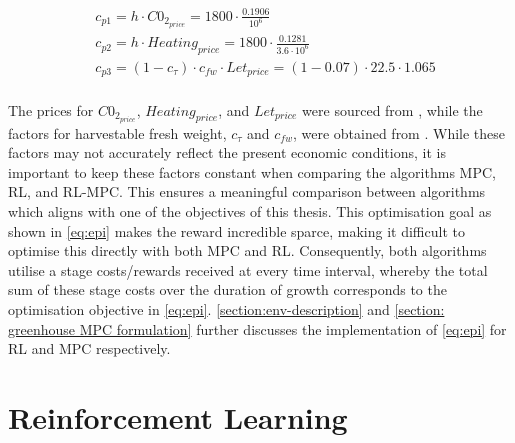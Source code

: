 \begin{equation}\label{eq:pricing factors}
	\begin{aligned}
		& c_{p1} = h \cdot C0_{2_{price}}  = 1800 \cdot \frac{0.1906}{10^{6}}\\
		& c_{p2} = h \cdot  Heating_{price} = 1800 \cdot \frac{0.1281}{3.6\cdot 10^{6}}\\
		& c_{p3} = (1-c_{\tau})  \cdot c_{fw} \cdot Let_{price}= (1-0.07) \cdot 22.5 \cdot 1.065 \\
	\end{aligned}
\end{equation}

The prices for $C0_{2_{price}}$, $Heating_{price}$, and $Let_{price}$ were sourced from \cite{vandenbemdRobustDeepReinforcement}, while the factors for harvestable fresh weight, $c_{\tau}$ and $c_{fw}$, were obtained from \cite{hentenGreenhouseClimateManagement1994}. While these factors may not accurately reflect the present economic conditions, it is important to keep these factors constant when comparing the algorithms MPC, RL, and RL-MPC. This ensures a meaningful comparison between algorithms which aligns with one of the objectives of this thesis. This optimisation goal as shown in \autoref{eq:epi} makes the reward incredible sparce, making it difficult to optimise this directly with both MPC and RL. Consequently, both algorithms utilise a stage costs/rewards received at every time interval, whereby the total sum of these stage costs over the duration of growth corresponds to the optimisation objective in \autoref{eq:epi}. \autoref{section:env-description} and \autoref{section: greenhouse MPC formulation} further discusses the implementation of \autoref{eq:epi} for RL and MPC respectively.


\section{Reinforcement Learning}

